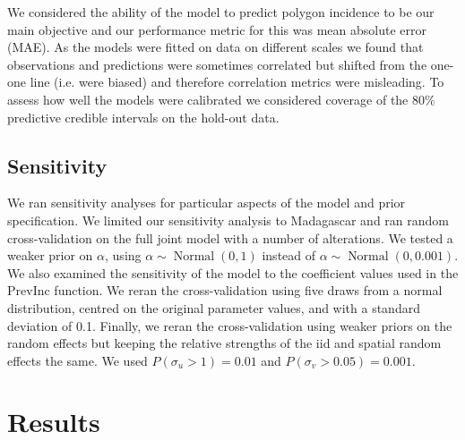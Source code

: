 \documentclass{statsoc}
\begin{document}
We considered the ability of the model to predict polygon incidence to be our main objective and our performance metric for this was mean absolute error (MAE).
As the models were fitted on data on different scales we found that observations and predictions were sometimes correlated but shifted from the one-one line (i.e. were biased) and therefore correlation metrics were misleading.
To assess how well the models were calibrated we considered coverage of the 80\% predictive credible intervals on the hold-out data.


\subsection{Sensitivity}

We ran sensitivity analyses for particular aspects of the model and prior specification.
We limited our sensitivity analysis to Madagascar and ran random cross-validation on the full joint model with a number of alterations.
We tested a weaker prior on $\alpha$, using $\alpha \sim \operatorname{Normal}(0, 1)$ instead of $\alpha \sim \operatorname{Normal}(0, 0.001)$.
We also examined the sensitivity of the model to the coefficient values used in the PrevInc function. 
We reran the cross-validation using five draws from a normal distribution, centred on the original parameter values, and with a standard deviation of 0.1.
Finally, we reran the cross-validation using weaker priors on the random effects but keeping the relative strengths of the iid and spatial random effects the same.
We used $P(\sigma_u > 1) = 0.01$ and $P(\sigma_v > 0.05) = 0.001$.




\section*{Results}

\end{document}
